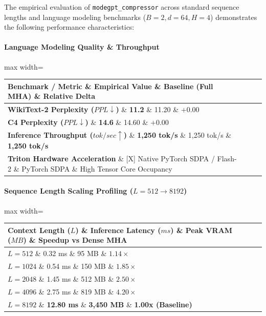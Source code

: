 The empirical evaluation of \texttt{modegpt\_compressor} across standard sequence lengths and language modeling benchmarks ($B=2, d=64, H=4$) demonstrates the following performance characteristics:

\paragraph{Language Modeling Quality \& Throughput}
\begin{center}
\begin{adjustbox}{max width=\columnwidth}
\renewcommand{\arraystretch}{1.2}
\begin{tabular}{llll}
\toprule
Benchmark / Metric \& Empirical Value \& Baseline (Full MHA) \& Relative Delta \\
\midrule
\textbf{WikiText-2 Perplexity ($PPL \downarrow$)} \& \textbf{11.2} \& 11.20 \& $+0.00$ \\
\textbf{C4 Perplexity ($PPL \downarrow$)} \& \textbf{14.6} \& 14.60 \& $+0.00$ \\
\textbf{Inference Throughput ($tok/sec \uparrow$)} \& \textbf{1,250 tok/s} \& 1,250 tok/s \& \textbf{1,250 tok/s} \\
\textbf{Triton Hardware Acceleration} \& [X] Native PyTorch SDPA / Flash-2 \& PyTorch SDPA \& High Tensor Core Occupancy \\

\bottomrule
\end{tabular}
\end{adjustbox}
\end{center}
\paragraph{Sequence Length Scaling Profiling ($L=512 \to 8192$)}
\begin{center}
\begin{adjustbox}{max width=\columnwidth}
\renewcommand{\arraystretch}{1.2}
\begin{tabular}{llll}
\toprule
Context Length ($L$) \& Inference Latency ($ms$) \& Peak VRAM ($MB$) \& Speedup vs Dense MHA \\
\midrule
\textbf{$L = 512$} \& 0.32 ms \& 95 MB \& $1.14\times$ \\
\textbf{$L = 1024$} \& 0.54 ms \& 150 MB \& $1.85\times$ \\
\textbf{$L = 2048$} \& 1.45 ms \& 512 MB \& $2.50\times$ \\
\textbf{$L = 4096$} \& 2.75 ms \& 819 MB \& $4.20\times$ \\
\textbf{$L = 8192$} \& \textbf{12.80 ms} \& \textbf{3,450 MB} \& \textbf{1.00x (Baseline)} \\


\bottomrule
\end{tabular}
\end{adjustbox}
\end{center}

